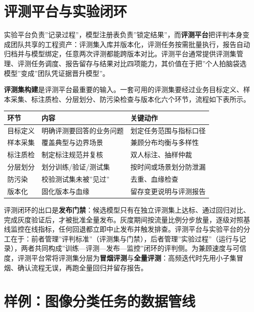 \documentclass[12pt,a4paper,twoside,openany]{ctexbook}
\numberwithin{figure}{chapter}
\numberwithin{table}{chapter}
\newcounter{none}
\begin{document}
\section{评测平台与实验闭环}\label{ux8bc4ux6d4bux5e73ux53f0ux4e0eux5b9eux9a8cux95edux73af}

实验平台负责''记录过程''，模型注册表负责''锁定结果''，而\textbf{评测平台}把评判本身变成团队共享的工程资产：评测集入库并版本化，评测任务按需批量执行，报告自动归档并与模型绑定，任意两次评测都能跨版本对比。评测平台通常提供评测集管理、评测任务调度、报告留存与结果对比四项能力，其价值在于把''个人拍脑袋选模型''变成''团队凭证据晋升模型''。

\textbf{评测集构建}是评测平台最重要的输入。一套可用的评测集要经过业务目标定义、样本采集、标注质检、分层划分、防污染检查与版本化六个环节，流程如下表所示。

{\def\LTcaptype{none} %
\begin{longtable}[]{@{}lll@{}}
\toprule\noalign{}
环节 & 内容 & 关键动作 \\
\midrule\noalign{}
\endhead
\bottomrule\noalign{}
\endlastfoot
目标定义 & 明确评测要回答的业务问题 & 划定任务范围与指标口径 \\
样本采集 & 覆盖典型与边界场景 & 兼顾分布均衡与多样性 \\
标注质检 & 制定标注规范并复核 & 双人标注、抽样仲裁 \\
分层划分 & 划分训练/验证/测试集 & 按时间或场景划分防泄漏 \\
防污染 & 校验测试集未被''见过'' & 去重、血缘检查 \\
版本化 & 固化版本与血缘 & 留存变更说明与评测报告 \\
\end{longtable}
}

评测闭环的出口是\textbf{发布门禁}：候选模型只有在独立评测集上达标、通过回归对比、完成灰度验证后，才被批准全量发布。灰度期间按流量比例分步放量，逐级对照基线监控在线指标，任何回退都立即中止发布并触发排查。评测平台与实验平台的分工在于：前者管理''评判标准''（评测集与门禁），后者管理''实验过程''（运行与记录），两者共同构成''训练---评测---发布---监控''闭环的评判侧。为兼顾速度与可信度，评测平台常将评测集分层为\textbf{冒烟评测}与\textbf{全量评测}：高频迭代时先用小子集冒烟、确认流程无误，再跑全量回归并留存报告。

\section{样例：图像分类任务的数据管线}\label{ux6837ux4f8bux56feux50cfux5206ux7c7bux4efbux52a1ux7684ux6570ux636eux7ba1ux7ebf}
\end{document}
